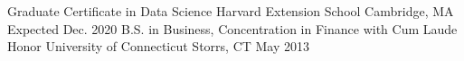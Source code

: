 

\begin{cventries}

  \cventry
    {Graduate Certificate in Data Science} %
    {Harvard Extension School} %
    {Cambridge, MA} %
    {Expected Dec. 2020} %
    {}
  \cventry
    {B.S. in Business, Concentration in Finance with Cum Laude Honor} %
    {University of Connecticut} %
    {Storrs, CT} %
    {May 2013} %
    {
    }
\end{cventries}
